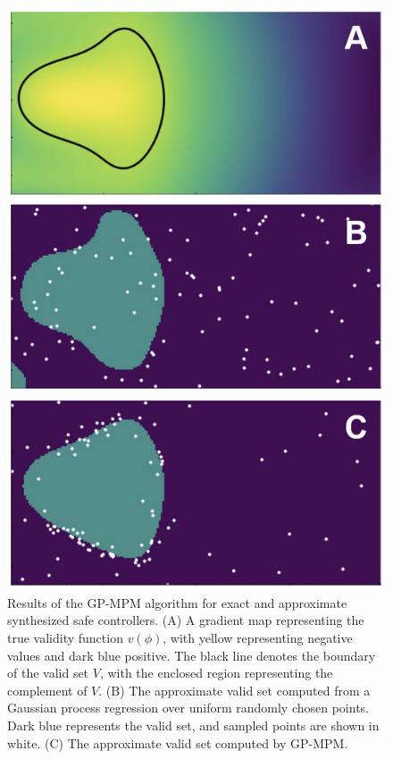 \documentclass[letterpaper, 10 pt, conference]{ieeeconf}  %
\begin{document}
\begin{figure}[htbp]
        \centerline{\includegraphics[width=0.9\columnwidth]{img/exp_result.png}}
        \caption{Results of the GP-MPM algorithm for exact and approximate synthesized safe controllers. (A) A gradient map representing the true validity function $v(\phi)$, with yellow representing negative values and dark blue positive. The black line denotes the boundary of the valid set $V$, with the enclosed region representing the complement of $V$. (B) The approximate valid set computed from a Gaussian process regression over uniform randomly chosen points. Dark blue represents the valid set, and sampled points are shown in white. (C) The approximate valid set computed by GP-MPM.}
        \label{fig:expres}
    \end{figure}
\end{document}
